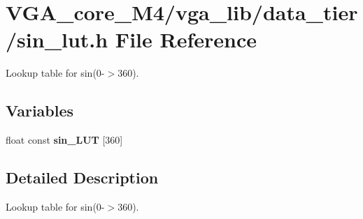 \section{V\+G\+A\+\_\+core\+\_\+\+M4/vga\+\_\+lib/data\+\_\+tier/sin\+\_\+lut.h File Reference}
\label{sin__lut_8h}


Lookup table for sin(0-\/$>$360).  


\subsection*{Variables}
\begin{DoxyCompactItemize}
\item 
float const {\bfseries sin\+\_\+\+L\+UT} [360]\label{sin__lut_8h_a9e9478bb798561f9e58ad7ec4d328e31}

\end{DoxyCompactItemize}


\subsection{Detailed Description}
Lookup table for sin(0-\/$>$360). 

